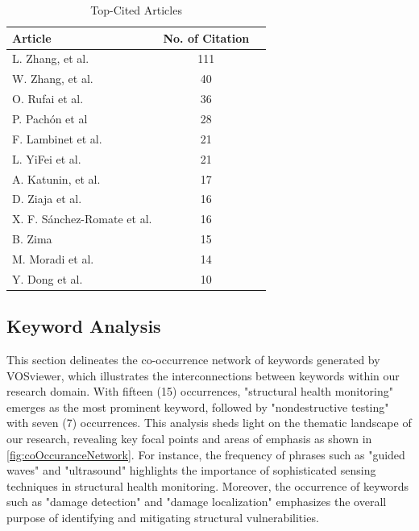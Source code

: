 \documentclass[journal, a4paper]{IEEEtran}
\begin{document}
\begin{table}[htbp]

  \centering
  \caption{Top-Cited Articles}
  \label{tbl:articleCites}
  \begin{tabular}{lcc}

      \toprule
      \textbf{Article} & \textbf{No. of Citation} \\
      \midrule
      L. Zhang, et al. \cite{zhang_structural_2021} & 111 \\
      W. Zhang, et al. \cite{zhang_defect_2020} & 40 \\
      O. Rufai et al. \cite{rufai_cure_2020} & 36 \\
      P. Pachón et al \cite{pachon_evaluation_2020} & 28 \\
      F. Lambinet et al. \cite{lambinet_measurement_2022} & 21 \\
      L. YiFei et al. \cite{yifei_structure_2023} & 21 \\
      A. Katunin, et al. \cite{katunin_modeling_2021} & 17 \\
      D. Ziaja et al. \cite{ziaja_shm_2021} & 16 \\
      X. F. Sánchez-Romate et al. \cite{sanchez-romate_structural_2021} & 16 \\
      B. Zima \cite{zima_damage_2021} & 15 \\
      M. Moradi et al. \cite{moradi_intelligent_2023} & 14 \\
      Y. Dong et al. \cite{dong_ultrasonic_2022} & 10 \\

      \bottomrule
  \end{tabular}
\end{table}




\subsection{Keyword Analysis}
This section delineates the co-occurrence network of keywords generated by VOSviewer,
which illustrates the interconnections between keywords within our research domain.
With fifteen (15) occurrences, "structural health monitoring" emerges as the most prominent keyword, followed by
"nondestructive testing" with seven (7) occurrences. This analysis sheds light on the thematic landscape of our research,
revealing key focal points and areas of emphasis as shown in \autoref{fig:coOccuranceNetwork}.
For instance, the frequency of phrases such as
"guided waves" and "ultrasound" highlights the importance of sophisticated sensing techniques in structural
health monitoring. Moreover, the occurrence of keywords such as "damage detection" and "damage localization"
emphasizes the overall purpose of identifying and mitigating structural vulnerabilities.
\end{document}
